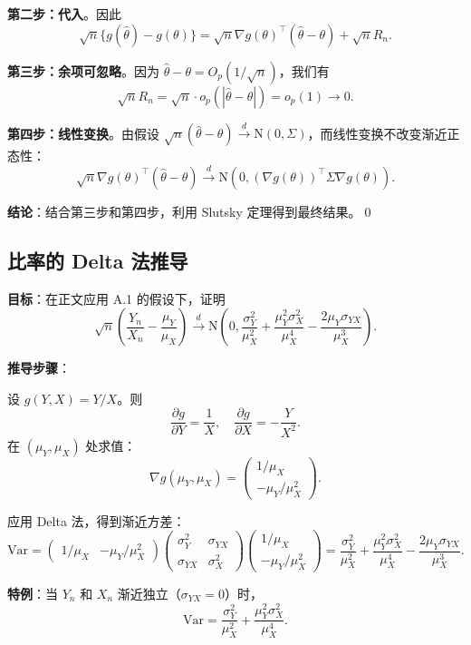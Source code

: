 \textbf{第二步：代入}。因此
\[
\sqrt{n}\{g(\hat{\theta}) - g(\theta)\} = \sqrt{n} \nabla g(\theta)^\top (\hat{\theta} - \theta) + \sqrt{n} R_n.
\]

\textbf{第三步：余项可忽略}。因为 $\hat{\theta} - \theta = O_p(1/\sqrt{n})$，我们有
\[
\sqrt{n} R_n = \sqrt{n} \cdot o_p(|\hat{\theta} - \theta|) = o_p(1) \to 0.
\]

\textbf{第四步：线性变换}。由假设 $\sqrt{n}(\hat{\theta} - \theta) \xrightarrow{d} \mathrm{N}(0, \Sigma)$，而线性变换不改变渐近正态性：
\[
\sqrt{n} \nabla g(\theta)^\top (\hat{\theta} - \theta) \xrightarrow{d} \mathrm{N}\left(0, (\nabla g(\theta))^\top \Sigma \nabla g(\theta)\right).
\]

\textbf{结论}：结合第三步和第四步，利用 Slutsky 定理得到最终结果。\qed

\subsection{比率的 Delta 法推导}\label{sec:appendix-ratio-delta-method}

\textbf{目标}：在正文应用 A.1 的假设下，证明
\[
\sqrt{n}\left(\frac{Y_n}{X_n} - \frac{\mu_Y}{\mu_X}\right) \xrightarrow{d} \mathrm{N}\left(0, \frac{\sigma_Y^2}{\mu_X^2} + \frac{\mu_Y^2 \sigma_X^2}{\mu_X^4} - \frac{2\mu_Y \sigma_{YX}}{\mu_X^3}\right).
\]

\textbf{推导步骤}：

设 $g(Y, X) = Y/X$。则
\[
\frac{\partial g}{\partial Y} = \frac{1}{X}, \quad \frac{\partial g}{\partial X} = -\frac{Y}{X^2}.
\]
在 $(\mu_Y, \mu_X)$ 处求值：
\[
\nabla g(\mu_Y, \mu_X) = \begin{pmatrix} 1/\mu_X \\ -\mu_Y/\mu_X^2 \end{pmatrix}.
\]

应用 Delta 法，得到渐近方差：
\[
\text{Var} = \begin{pmatrix} 1/\mu_X & -\mu_Y/\mu_X^2 \end{pmatrix}
\begin{pmatrix} \sigma_Y^2 & \sigma_{YX} \\ \sigma_{YX} & \sigma_X^2 \end{pmatrix}
\begin{pmatrix} 1/\mu_X \\ -\mu_Y/\mu_X^2 \end{pmatrix}
= \frac{\sigma_Y^2}{\mu_X^2} + \frac{\mu_Y^2 \sigma_X^2}{\mu_X^4} - \frac{2\mu_Y \sigma_{YX}}{\mu_X^3}.
\]

\textbf{特例}：当 $Y_n$ 和 $X_n$ 渐近独立（$\sigma_{YX} = 0$）时，
\[
\text{Var} = \frac{\sigma_Y^2}{\mu_X^2} + \frac{\mu_Y^2 \sigma_X^2}{\mu_X^4}.
\]

